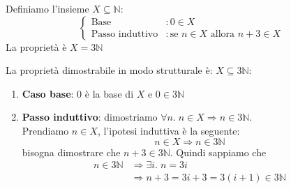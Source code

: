 \documentclass[a4paper]{article}
\begin{document}
\vspace{1em}
\noindent

\begin{example}
  Definiamo l'insieme \( X \subseteq \mathbb{N} \):
  \[
  \begin{cases}
    \text{Base} &: 0 \in X \\
    \text{Passo induttivo} &: \text{se } n \in X \text{ allora } n + 3 \in X
  \end{cases}
  \] 
  La proprietà è \( X = 3 \mathbb{N} \) 

  \vspace{1em}
  \noindent
  La proprietà dimostrabile in modo strutturale è: \( X \subseteq 3 \mathbb{N} \):
  \begin{enumerate}
    \item \textbf{Caso base}: \( 0 \) è la base di \( X \) e \( 0 \in 3 \mathbb{N} \) 
    \item \textbf{Passo induttivo}: dimostriamo \( \forall n.\; n \in X \Rightarrow n \in 3 \mathbb{N} \).\\
      Prendiamo \( n \in X \), l'ipotesi induttiva è la seguente:
      \[
        n \in X \Rightarrow n \in 3 \mathbb{N}
      \] 
      bisogna dimostrare che \( n+3 \in 3 \mathbb{N} \). Quindi sappiamo che
      \[
        \begin{aligned}
          n \in  3 \mathbb{N} &\Rightarrow \exists i .\; n = 3i\\
                              &\Rightarrow n + 3 = 3i + 3 = 3(i + 1) \in 3 \mathbb{N}
        \end{aligned}
      \] 
  \end{enumerate}
\end{example}
\end{document}
